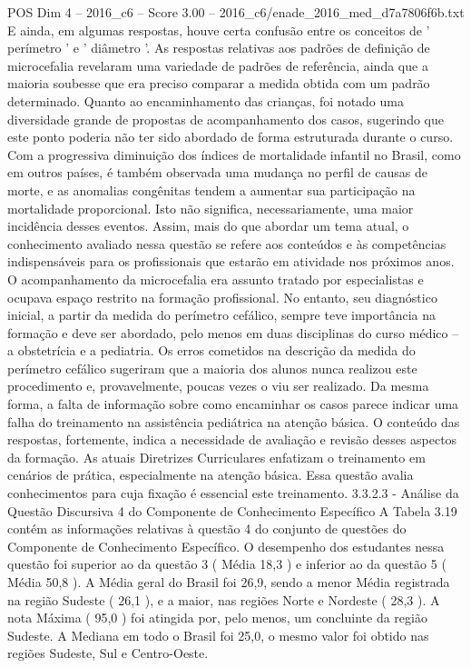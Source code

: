 \begin{textsample}{POS Dim 4 – 2016\_c6 – Score 3.00 – 2016\_c6/enade\_2016\_med\_d7a7806f6b.txt}
E ainda, em algumas respostas, houve certa confusão entre os conceitos de ' perímetro ' e ' diâmetro '.
As respostas relativas aos padrões de definição de microcefalia revelaram uma variedade de padrões de referência, ainda que a maioria soubesse que era preciso comparar a medida obtida com um padrão determinado.
Quanto ao encaminhamento das crianças, foi notado uma diversidade grande de propostas de acompanhamento dos casos, sugerindo que este ponto poderia não ter sido abordado de forma estruturada durante o curso.
Com a progressiva diminuição dos índices de mortalidade infantil no Brasil, como em outros países, é também observada uma mudança no perfil de causas de morte, e as anomalias congênitas tendem a aumentar sua participação na mortalidade proporcional.
Isto não significa, necessariamente, uma maior incidência desses eventos.
Assim, mais do que abordar um tema atual, o conhecimento avaliado nessa questão se refere aos conteúdos e às competências indispensáveis para os profissionais que estarão em atividade nos próximos anos.
O acompanhamento da microcefalia era assunto tratado por especialistas e ocupava espaço restrito na formação profissional.
No entanto, seu diagnóstico inicial, a partir da medida do perímetro cefálico, sempre teve importância na formação e deve ser abordado, pelo menos em duas disciplinas do curso médico – a obstetrícia e a pediatria.
Os erros cometidos na descrição da medida do perímetro cefálico sugeriram que a maioria dos alunos nunca realizou este procedimento e, provavelmente, poucas vezes o viu ser realizado.
Da mesma forma, a falta de informação sobre como encaminhar os casos parece indicar uma falha do treinamento na assistência pediátrica na atenção básica.
O conteúdo das respostas, fortemente, indica a necessidade de avaliação e revisão desses aspectos da formação.
As atuais Diretrizes Curriculares enfatizam o treinamento em cenários de prática, especialmente na atenção básica.
Essa questão avalia conhecimentos para cuja fixação é essencial este treinamento. 3.3.2.3 - Análise da Questão Discursiva 4 do Componente de Conhecimento Específico A Tabela 3.19 contém as informações relativas à questão 4 do conjunto de questões do Componente de Conhecimento Específico.
O desempenho dos estudantes nessa questão foi superior ao da questão 3 ( Média 18,3 ) e inferior ao da questão 5 ( Média 50,8 ).
A Média geral do Brasil foi 26,9, sendo a menor Média registrada na região Sudeste ( 26,1 ), e a maior, nas regiões Norte e Nordeste ( 28,3 ).
A nota Máxima ( 95,0 ) foi atingida por, pelo menos, um concluinte da região Sudeste.
A Mediana em todo o Brasil foi 25,0, o mesmo valor foi obtido nas regiões Sudeste, Sul e Centro-Oeste.

\end{textsample}
